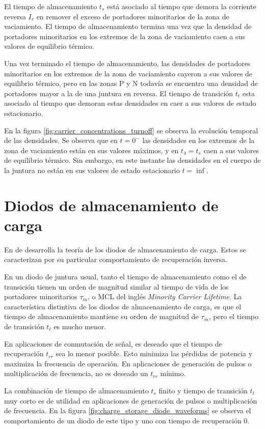 El tiempo de almacenamiento $t_s$ está asociado al tiempo que demora la
corriente reversa $I_r$ en remover el exceso de portadores minoritarios de la
zona de vaciamiento. El tiempo de almacenamiento termina una vez que la densidad
de portadores minoritarios en los extremos de la zona de vaciamiento caen a sus
valores de equilibrio térmico.

Una vez terminado el tiempo de almacenamiento, las densidades de portadores
minoritarios en los extremos de la zona de vaciamiento cayeron a sus valores de
equilibrio térmico, pero en las zonas P y N todavía se encuentra una densidad de
portadores mayor a la de una juntura en reversa. El tiempo de transición $t_t$
esta asociado al tiempo que demoran estas densidades en caer a sus valores de
estado estacionario.

En la figura \ref{fig:carrier_concentrations_turnoff} se observa la evolución
temporal de las densidades. Se observa que en $t=0^-$ las densidades en los
extremos de la zona de vaciamiento están en sus valores máximos, y en $t_4=t_s$
caen a sus valores de equilibrio térmico. Sin embargo, en este instante las
densidades en el cuerpo de la juntura no están en sus valores de estado
estacionario $t=\inf$.

\section{Diodos de almacenamiento de carga}
\label{sec:charge_storage_diodes}

En \cite{moll1962} de desarrolla la teoría de los diodos de almacenamiento de
carga. Estos se caracterizan por su particular comportamiento de recuperación
inversa.

En un diodo de juntura usual, tanto el tiempo de almacenamiento como el de
transición tienen un orden de magnitud similar al tiempo de vida de los
portadores minoritarios $\tau_m$, o MCL del inglés \textit{Minority Carrier
Lifetime}. La característica distintiva de los diodos de almacenamiento de
carga, es que el tiempo de almacenamiento mantiene su orden de magnitud de
$\tau_m$, pero el tiempo de transición $t_t$ es mucho menor. \cite{moll1962}

En aplicaciones de conmutación de señal, es deseado que el tiempo de
recuperación $t_{rr}$ sea lo menor posible. Esto minimiza las pérdidas de
potencia y maximiza la frecuencia de operación. En aplicaciones de generación de
pulsos o multiplicación de frecuencia, no es deseado un $t_{rr}$ mínimo.

La combinación de tiempo de almacenamiento $t_s$ finito y tiempo de transición
$t_t$ muy corto es de utilidad en aplicaciones de generación de pulsos o
multiplicación de frecuencia. En la figura
\ref{fig:charge_storage_diode_waveforms} se observa el comportamiento de un
diodo de este tipo y uno con tiempo de recuperación 0.

